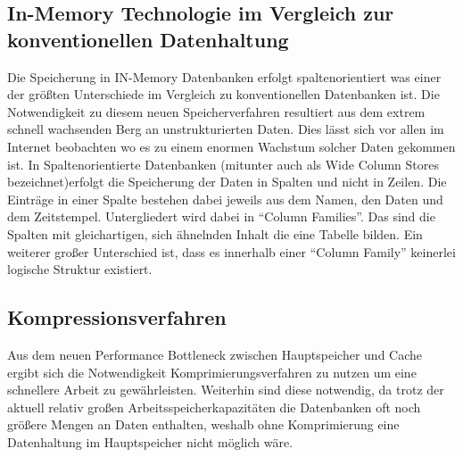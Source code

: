 \documentclass[a4paper, 12pt]{scrartcl}
\begin{document}
\newpage 
\subsection{In-Memory Technologie im Vergleich zur konventionellen Datenhaltung}
Die Speicherung in IN-Memory Datenbanken erfolgt spaltenorientiert was einer der größten Unterschiede im Vergleich zu konventionellen Datenbanken ist. Die Notwendigkeit zu diesem neuen Speicherverfahren resultiert aus dem extrem schnell wachsenden Berg an unstrukturierten Daten. Dies lässt sich vor allen im Internet beobachten wo es zu einem enormen Wachstum solcher Daten gekommen ist. 
In Spaltenorientierte Datenbanken (mitunter auch als Wide Column Stores bezeichnet)erfolgt die Speicherung der Daten in Spalten und nicht in Zeilen. Die Einträge in einer Spalte bestehen dabei jeweils aus dem Namen, den Daten und dem Zeitstempel. Untergliedert wird dabei in "`Column Families"'. Das sind die Spalten mit gleichartigen, sich ähnelnden Inhalt die eine Tabelle bilden. 
Ein weiterer großer Unterschied ist, dass es innerhalb einer "`Column Family"' keinerlei logische Struktur existiert.  
\newpage
\subsection{Kompressionsverfahren}
Aus dem neuen Performance Bottleneck zwischen Hauptspeicher und Cache ergibt sich die Notwendigkeit Komprimierungsverfahren zu nutzen um eine  schnellere Arbeit zu gewährleisten. Weiterhin sind diese notwendig, da trotz der aktuell relativ großen Arbeitsspeicherkapazitäten die Datenbanken oft noch größere Mengen an Daten enthalten, weshalb ohne Komprimierung eine Datenhaltung im Hauptspeicher nicht möglich wäre. 
\end{document}
